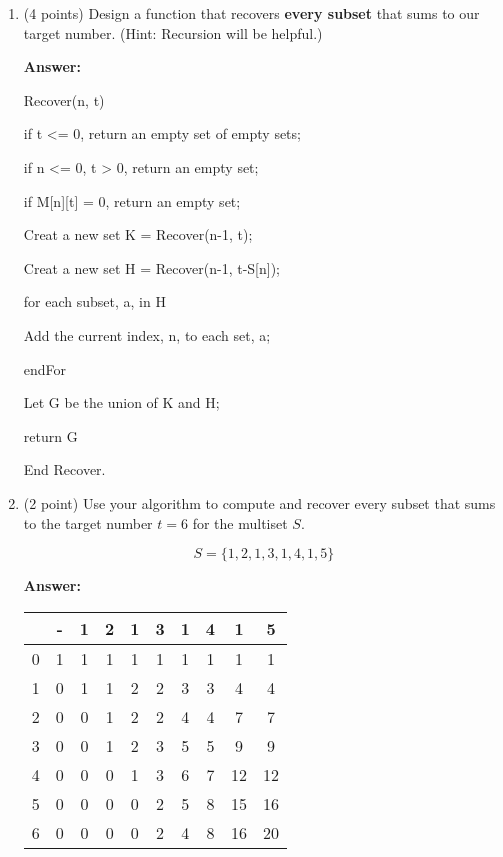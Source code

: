 \documentclass[paper=a4, fontsize=11pt]{scrartcl}
\newcommand\tab[1][0.6cm]{\hspace*{#1}}
\numberwithin{equation}{section}		%
\numberwithin{figure}{section}			%
\numberwithin{table}{section}				%
\begin{document}
\begin{enumerate}
\item (4 points) Design a function that recovers \textbf{every subset} that sums to our target number.  (Hint: Recursion will be helpful.)

\textbf{Answer:}

Recover(n, t)

\tab if t <= 0, return an empty set of empty sets;

\tab if n <= 0, t > 0, return an empty set;

\tab if M[n][t] = 0, return an empty set;

\tab Creat a new set K = Recover(n-1, t);

\tab Creat a new set H = Recover(n-1, t-S[n]);

\tab for each subset, a, in H

\tab \tab Add the current index, n, to each set, a;

\tab endFor

\tab Let G be the union of K and H;

\tab return G

End Recover.
 

\item (2 point) Use your algorithm to compute and recover every subset that sums to the target number $t=6$ for the multiset $S$.

\[
S=\{1,2,1,3,1,4,1,5\}
\]

\textbf{Answer:}

\begin{center}
	\begin{tabular}{||c||c|c| c| c| c| c| c| c| c||} 
		\hline
		 & - & 1 & 2 & 1 & 3 & 1 & 4 & 1 & 5 \\
		\hline\hline
		0 & 1 & 1 & 1 & 1 & 1 & 1 & 1 & 1 & 1 \\
		\hline
		1 & 0 & 1 & 1 & 2 & 2 & 3 & 3 & 4 & 4 \\ 
		\hline
		2 & 0 & 0 & 1 & 2 & 2 & 4 & 4 & 7 & 7 \\
		\hline
		3 & 0 & 0 & 1 & 2 & 3 & 5 & 5 & 9 & 9 \\
		\hline
		4 & 0 & 0 & 0 & 1 & 3 & 6 & 7 & 12 & 12 \\
		\hline
		5 & 0 & 0 & 0 & 0 & 2 & 5 & 8 & 15 & 16 \\ 
		\hline
		6 & 0 & 0 & 0 & 0 & 2 & 4 & 8 & 16 & 20\\
		\hline
	\end{tabular}
\end{center}

\


\end{enumerate}
\end{document}
